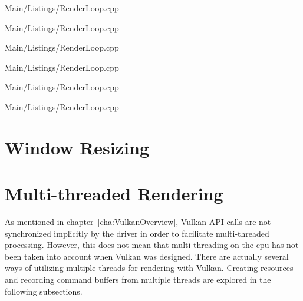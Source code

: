     
    {Main/Listings/RenderLoop.cpp}

    
    {Main/Listings/RenderLoop.cpp}

    
    {Main/Listings/RenderLoop.cpp}

    
    {Main/Listings/RenderLoop.cpp}


    
    {Main/Listings/RenderLoop.cpp}

    
    {Main/Listings/RenderLoop.cpp}

  \section{Window Resizing}
    \tbd

  \section{Multi-threaded Rendering}
  \label{sec:MultithreadedRendering}
    As mentioned in chapter~\ref{cha:VulkanOverview}, Vulkan API calls are not synchronized implicitly by the \gls{driver} in order to facilitate multi-threaded processing.
    However, this does not mean that multi-threading on the \gls{cpu} has not been taken into account when Vulkan was designed.
    There are actually several ways of utilizing multiple threads for rendering with Vulkan.
    Creating resources and recording command buffers from multiple threads are explored in the following subsections.


